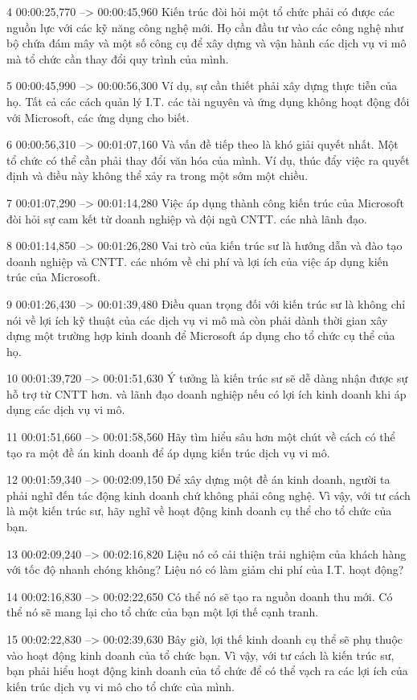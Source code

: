 4
00:00:25,770 --> 00:00:45,960
Kiến trúc đòi hỏi một tổ chức phải có được các nguồn lực với các kỹ năng công nghệ mới.  Họ cần đầu tư vào các công nghệ như bộ chứa đám mây và một số công cụ để xây dựng và vận hành các dịch vụ vi mô mà tổ chức cần thay đổi quy trình của mình.

5
00:00:45,990 --> 00:00:56,300
Ví dụ, sự cần thiết phải xây dựng thực tiễn của họ.  Tất cả các cách quản lý I.T.  các tài nguyên và ứng dụng không hoạt động đối với Microsoft, các ứng dụng cho biết.

6
00:00:56,310 --> 00:01:07,160
Và vấn đề tiếp theo là khó giải quyết nhất.  Một tổ chức có thể cần phải thay đổi văn hóa của mình.  Ví dụ, thúc đẩy việc ra quyết định và điều này không thể xảy ra trong một sớm một chiều.

7
00:01:07,290 --> 00:01:14,280
Việc áp dụng thành công kiến ​​trúc của Microsoft đòi hỏi sự cam kết từ doanh nghiệp và đội ngũ CNTT.  các nhà lãnh đạo.

8
00:01:14,850 --> 00:01:26,280
Vai trò của kiến ​​trúc sư là hướng dẫn và đào tạo doanh nghiệp và CNTT.  các nhóm về chi phí và lợi ích của việc áp dụng kiến ​​trúc của Microsoft.

9
00:01:26,430 --> 00:01:39,480
Điều quan trọng đối với kiến ​​trúc sư là không chỉ nói về lợi ích kỹ thuật của các dịch vụ vi mô mà còn phải dành thời gian xây dựng một trường hợp kinh doanh để Microsoft áp dụng cho tổ chức cụ thể của họ.

10
00:01:39,720 --> 00:01:51,630
Ý tưởng là kiến ​​trúc sư sẽ dễ dàng nhận được sự hỗ trợ từ CNTT hơn.  và lãnh đạo doanh nghiệp nếu có lợi ích kinh doanh khi áp dụng các dịch vụ vi mô.

11
00:01:51,660 --> 00:01:58,560
Hãy tìm hiểu sâu hơn một chút về cách có thể tạo ra một đề án kinh doanh để áp dụng kiến ​​trúc dịch vụ vi mô.

12
00:01:59,340 --> 00:02:09,150
Để xây dựng một đề án kinh doanh, người ta phải nghĩ đến tác động kinh doanh chứ không phải công nghệ.  Vì vậy, với tư cách là một kiến ​​trúc sư, hãy nghĩ về hoạt động kinh doanh cụ thể cho tổ chức của bạn.

13
00:02:09,240 --> 00:02:16,820
Liệu nó có cải thiện trải nghiệm của khách hàng với tốc độ nhanh chóng không?  Liệu nó có làm giảm chi phí của I.T.  hoạt động?

14
00:02:16,830 --> 00:02:22,650
Có thể nó sẽ tạo ra nguồn doanh thu mới.  Có thể nó sẽ mang lại cho tổ chức của bạn một lợi thế cạnh tranh.

15
00:02:22,830 --> 00:02:39,630
Bây giờ, lợi thế kinh doanh cụ thể sẽ phụ thuộc vào hoạt động kinh doanh của tổ chức bạn.  Vì vậy, với tư cách là kiến ​​trúc sư, bạn phải hiểu hoạt động kinh doanh của tổ chức để có thể vạch ra các lợi ích của kiến ​​trúc dịch vụ vi mô cho tổ chức của mình.

